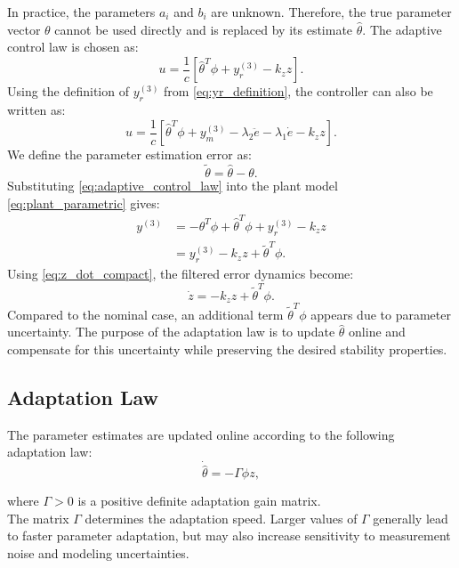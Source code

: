 In practice, the parameters \(a_i\) and \(b_i\) are unknown. Therefore, the true parameter vector \(\theta\) cannot be used directly and is replaced by its estimate \(\hat{\theta}\). The adaptive control law is chosen as:
\begin{equation}
u
=
\frac{1}{c}
\left[
\hat{\theta}^{T}\phi
+
y_r^{(3)}
-
k_z z
\right].
\label{eq:adaptive_control_law}
\end{equation}
Using the definition of \(y_r^{(3)}\) from \eqref{eq:yr_definition}, the controller can also be written as:
\begin{equation}
u
=
\frac{1}{c}
\left[
\hat{\theta}^{T}\phi
+
y_m^{(3)}
-
\lambda_2\ddot{e}
-
\lambda_1\dot{e}
-
k_z z
\right].
\end{equation}
We define the parameter estimation error as:
\begin{equation}
\tilde{\theta}
=
\hat{\theta}
-
\theta.
\end{equation}
Substituting \eqref{eq:adaptive_control_law} into the plant model \eqref{eq:plant_parametric} gives:
\begin{align}
y^{(3)}
&=
-\theta^T\phi
+
\hat{\theta}^{T}\phi
+
y_r^{(3)}
-
k_z z \\
&=
y_r^{(3)}
-
k_z z
+
\tilde{\theta}^{T}\phi.
\end{align}
Using \eqref{eq:z_dot_compact}, the filtered error dynamics become:
\begin{equation}
\dot{z}
=
-k_z z
+
\tilde{\theta}^{T}\phi.
\label{eq:z_dynamics}
\end{equation}
Compared to the nominal case, an additional term \(\tilde{\theta}^{T}\phi\) appears due to parameter uncertainty. The purpose of the adaptation law is to update \(\hat{\theta}\) online and compensate for this uncertainty while preserving the desired stability properties.

\subsection{Adaptation Law}

The parameter estimates are updated online according to the following adaptation law:
\begin{equation}
\dot{\hat{\theta}}
=
-\Gamma \phi z,
\label{eq:adaptation_law}
\end{equation}

where \(\Gamma>0\) is a positive definite adaptation gain matrix.
\\

\noindent The matrix \(\Gamma\) determines the adaptation speed. Larger values of \(\Gamma\) generally lead to faster parameter adaptation, but may also increase sensitivity to measurement noise and modeling uncertainties.

